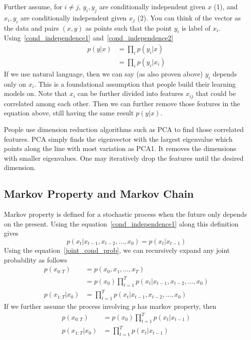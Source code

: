 \documentclass{book}
\numberwithin{equation}{subsection}
\begin{document}
Further assume, for $i \neq j$, $y_i, y_j$ are conditionally independent given $x$ (1), and $x_i, y_i$ are conditionally independent given $x_j$ (2). You can think of the vector as the data and pairs $(x,y)$ as points such that the point $y_i$ is label of $x_i$. Using~\ref{cond_independence1} and~\ref{cond_independence2}
\begin{align}
    p(y|x) &= \prod_i p(y_i|x)\\
           &= \prod_i p(y_i|x_i)
\end{align}
If we use natural language, then we can say (as also proven above) $y_i$ depends only on $x_i$. This is a foundational assumption that people build their learning models on. Note that $x_i$ can be further divided into features $x_{ij}$ that could be correlated among each other. Then we can further remove those features in the equation above, still having the same result $p(y|x)$.

People use dimension reduction algorithms such as PCA to find those correlated features. PCA simply finds the eigenvector with the largest eigenvalue which points along the line with most variation as PCA1. It removes the dimensions with smaller eigenvalues. One may iteratively drop the features until the desired dimension.
\subsection{Markov Property and Markov Chain}
Markov property is defined for a stochastic process when the future only depends on the present. Using the equation~\ref{cond_independence1} along this definition gives
\begin{equation}
    p(x_t|x_{t-1},x_{t-2},...,x_0) = p(x_t|x_{t-1})
\end{equation}
Using the equation~\ref{joint_cond_prob}, we can recursively expand any joint probability as follows
\begin{align}
    p(x_{0:T}) &= p(x_0,x_1,...,x_T) \\
    &= p(x_0)\prod_{t=1}^T p(x_t|x_{t-1},x_{t-2},...,x_0)\\
    p(x_{1:T}|x_0) &= \prod_{t=1}^T p(x_t|x_{t-1},x_{t-2},...,x_0)
\end{align}
If we further assume the process involving $p$ has markov property, then
\begin{align}
    p(x_{0:T}) &= p(x_0)\prod_{t=1}^T p(x_t|x_{t-1}) \label{markov_chain_joint}\\
    p(x_{1:T}|x_0) &= \prod_{t=1}^T p(x_t|x_{t-1}) \label{markov_chain_cond}
\end{align}
\end{document}
